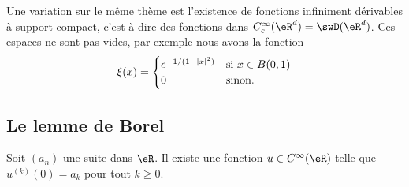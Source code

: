 Une variation sur le même thème est l'existence de fonctions infiniment dérivables à support compact, c'est à dire des fonctions dans \(  C^{\infty}_c(\eR^d)=\swD(\eR^d)\). Ces espaces ne sont pas vides, par exemple nous avons la fonction
\begin{equation}    \label{EqOBYNEMu}
    \xi(x)=\begin{cases}
        e^{-1/(1-| x |^2)}    &   \text{si \( x\in B(0,1)\)}\\
        0    &    \text{sinon}.
    \end{cases}
\end{equation}

\subsection{Le lemme de Borel}

\begin{lemma} \label{LemRENlIEL}
    Soit \( (a_n)\) une suite dans \( \eR\). Il existe une fonction \( u\in C^{\infty}(\eR)\) telle que \( u^{(k)}(0)=a_k\) pour tout \( k\geq 0\).
\end{lemma}

